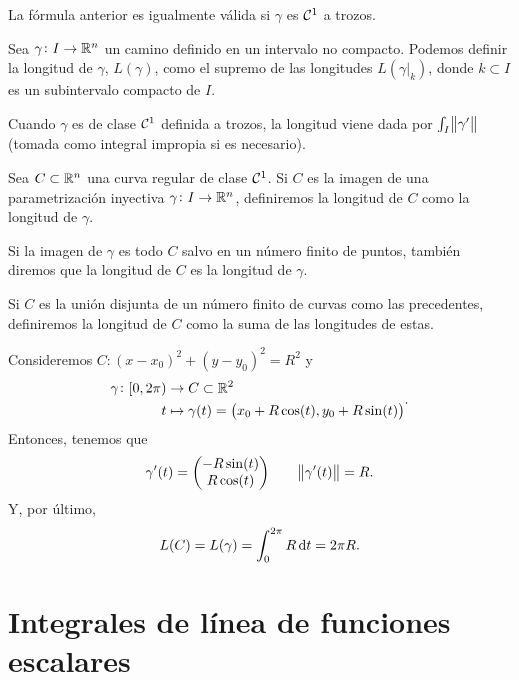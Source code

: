\begin{obs}
    La fórmula anterior es igualmente válida si $\gamma$ es $\mathcal{C}^1$ a trozos.
\end{obs}

\begin{defi}
    Sea $\gamma \colon I \to \mathbb{R}^n$ un camino definido en un intervalo no compacto. Podemos definir la longitud de $\gamma$, $L(\gamma)$,
    como el supremo de las longitudes $L(\gamma\vert_{k})$, donde $k \subset I$ es un subintervalo compacto de $I$.

    Cuando $\gamma$ es de clase $\mathcal{C}^1$ definida a trozos, la longitud viene dada por $\int_I \norm{\gamma^\prime}$ (tomada como integral impropia
    si es necesario).
\end{defi}


\begin{defi} \label{defi:observaciones_curvas}
    Sea $C \subset \mathbb{R}^n$ una curva regular de clase $\mathcal{C}^1$. Si $C$ es la imagen de una parametrización inyectiva $\gamma \colon I \to \mathbb{R}^n$,
    definiremos la longitud de $C$ como la longitud de $\gamma$.

    Si la imagen de $\gamma$ es todo $C$ salvo en un número finito de puntos, tambi\'en diremos que la longitud de $C$ es la longitud de $\gamma$.

    Si $C$ es la unión disjunta de un número finito de curvas como las precedentes, definiremos la longitud de $C$ como la suma de las longitudes
    de estas.
\end{defi}

\begin{example}
    Consideremos $C \colon \left( x - x_0 \right)^2 + \left( y - y_0 \right)^2 = R^2$ y
    \[
        \begin{aligned}
            \gamma \colon [0,2\pi) &\to C \subset \mathbb{R}^2 \\
            t &\mapsto \gamma(t) = \left( x_0 + R\cos(t), y_0 + R\sin(t) \right)
        \end{aligned}.
    \]
    Entonces, tenemos que
    \[
        \gamma^\prime(t) = \begin{pmatrix} -R\sin(t) \\ R \cos(t) \end{pmatrix} \qquad
        \norm{\gamma^\prime(t)} = R.
    \]
    Y, por último,
    \[
        L(C) = L(\gamma) = \int^{2\pi}_0 R \dif t = 2\pi R.
    \]
\end{example}

\section{Integrales de línea de funciones escalares}

